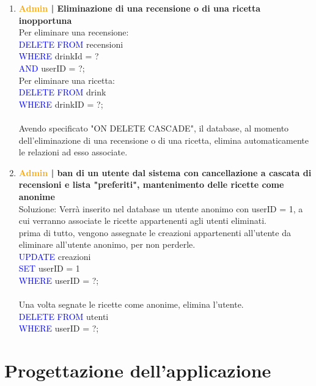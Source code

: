 \documentclass[a4paper,12pt]{report}
\begin{document}
\begin{enumerate}
    \item \textbf{\textcolor{orange}{Admin} | Eliminazione di una recensione o di una ricetta inopportuna}\\
    Per eliminare una recensione:\\
        \textcolor{blue}{DELETE FROM} recensioni\\
        \textcolor{blue}{WHERE} drinkId = ?\\
        \textcolor{blue}{AND} userID = ?;\\

    Per eliminare una ricetta:\\
        \textcolor{blue}{DELETE FROM} drink\\
        \textcolor{blue}{WHERE} drinkID = ?;
        \\\\
        Avendo specificato "ON DELETE CASCADE", il database, al momento dell'eliminazione di una recensione o di una ricetta, elimina automaticamente le relazioni ad esso associate.
    
    \item \textbf{\textcolor{orange}{Admin} | ban di un utente dal sistema con cancellazione a cascata di recensioni e lista "preferiti", mantenimento delle ricette come anonime}\\
        Soluzione: Verrà inserito nel database un utente anonimo con userID = 1, a cui verranno associate le ricette appartenenti agli utenti eliminati.
        \\
        prima di tutto, vengono assegnate le creazioni appartenenti all'utente da eliminare all'utente anonimo, per non perderle.\\
        \textcolor{blue}{UPDATE} creazioni\\
        \textcolor{blue}{SET} userID = 1\\
        \textcolor{blue}{WHERE} userID = ?;\\
        \\
        Una volta segnate le ricette come anonime, elimina l'utente.\\
        \textcolor{blue}{DELETE FROM} utenti\\
        \textcolor{blue}{WHERE} userID = ?;
        
\end{enumerate}


\newpage
\section{Progettazione dell'applicazione}
\end{document}
